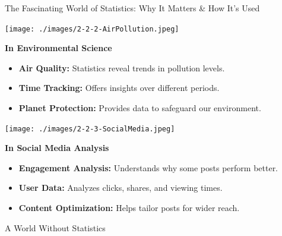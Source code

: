 \documentclass[final]{beamer}
\begin{document}
\begin{frame}[t]{}
\begin{columns}[t]
\begin{column}{.33\textwidth}
\begin{block}{The Fascinating World of Statistics: Why It Matters \& How It's Used}
				\vspace{2.5cm}

				\begin{minipage}{0.28\textwidth}
					\centering
					\texttt{[image: ./images/2-2-2-AirPollution.jpeg]}
				\end{minipage}
				\hfill
				\begin{minipage}{0.71\textwidth}
					\textbf{In Environmental Science}
					\begin{itemize}
						\item \textbf{Air Quality:} Statistics reveal trends in pollution levels.
						\item \textbf{Time Tracking:} Offers insights over different periods.
						\item \textbf{Planet Protection:} Provides data to safeguard our environment.
					\end{itemize}
				\end{minipage}

				\vspace{2.5cm}

				\begin{minipage}{0.28\textwidth}
					\centering
					\texttt{[image: ./images/2-2-3-SocialMedia.jpeg]}
				\end{minipage}
				\hfill
				\begin{minipage}{0.71\textwidth}
					\textbf{In Social Media Analysis}
					\begin{itemize}
						\item \textbf{Engagement Analysis:} Understands why some posts perform better.
						\item \textbf{User Data:} Analyzes clicks, shares, and viewing times.
						\item \textbf{Content Optimization:} Helps tailor posts for wider reach.
					\end{itemize}
				\end{minipage}
				
				\vspace{2cm}				

			\end{block}

			\vspace{0.5cm}
			
			\begin{block}{A World Without Statistics}
				
				\vspace{1.1cm}
				

\end{block}
\end{column}
\end{columns}
\end{frame}
\end{document}
